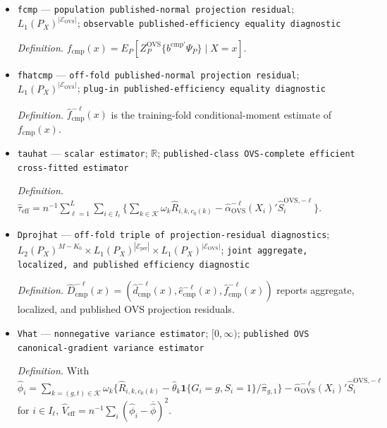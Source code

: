 \documentclass{article}
\begin{document}
\begin{itemize}
  \item \texttt{fcmp} --- \texttt{population published-\allowbreak{}normal projection residual}; \(L_1(P_X)^{|\mathcal E_{\mathrm{OVS}}|}\); \texttt{observable published-\allowbreak{}efficiency equality diagnostic}
  \par\smallskip\noindent\emph{Definition.} \(f_{\mathrm{cmp}}(x)=E_P[Z_P^{\mathrm{OVS}}\{b^{\mathrm{cmp}\prime}\Psi_P\}\mid X=x]\).
  \item \texttt{fhatcmp} --- \texttt{off-\allowbreak{}fold published-\allowbreak{}normal projection residual}; \(L_1(P_X)^{|\mathcal E_{\mathrm{OVS}}|}\); \texttt{plug-\allowbreak{}in published-\allowbreak{}efficiency equality diagnostic}
  \par\smallskip\noindent\emph{Definition.} \(\widehat f_{\mathrm{cmp}}^{-\ell}(x)\) is the training-fold conditional-moment estimate of \(f_{\mathrm{cmp}}(x)\).
  \item \texttt{tauhat} --- \texttt{scalar estimator}; \(\mathbb R\); \texttt{published-\allowbreak{}class OVS-\allowbreak{}complete efficient cross-\allowbreak{}fitted estimator}
  \par\smallskip\noindent\emph{Definition.} \(\widehat\tau_{\mathrm{eff}}=n^{-1}\sum_{\ell=1}^L\sum_{i\in I_\ell}\{\sum_{k\in\mathcal K}\omega_k\widehat R_{i,k,c_0(k)}-\widehat\alpha_{\mathrm{OVS}}^{-\ell}(X_i)'\widehat S_i^{\mathrm{OVS},-\ell}\}\).
  \item \texttt{Dprojhat} --- \texttt{off-\allowbreak{}fold triple of projection-\allowbreak{}residual diagnostics}; \(L_2(P_X)^{M-K_0}\times L_1(P_X)^{|\mathcal E_{\mathrm{per}}|}\times L_1(P_X)^{|\mathcal E_{\mathrm{OVS}}|}\); \texttt{joint aggregate,\allowbreak{} localized,\allowbreak{} and published efficiency diagnostic}
  \par\smallskip\noindent\emph{Definition.} \(\widehat D_{\mathrm{cmp}}^{-\ell}(x)=(\widehat d_{\mathrm{cmp}}^{-\ell}(x),\widehat e_{\mathrm{cmp}}^{-\ell}(x),\widehat f_{\mathrm{cmp}}^{-\ell}(x))\) reports aggregate, localized, and published OVS projection residuals.
  \item \texttt{Vhat} --- \texttt{nonnegative variance estimator}; \([0,\infty)\); \texttt{published OVS canonical-\allowbreak{}gradient variance estimator}
  \par\smallskip\noindent\emph{Definition.} With \(\widehat\phi_i=\sum_{k=(g,t)\in\mathcal K}\omega_k\{\widehat R_{i,k,c_0(k)}-\widehat\theta_k\mathbf 1\{G_i=g,S_i=1\}/\widehat\pi_{g,1}\}-\widehat\alpha_{\mathrm{OVS}}^{-\ell}(X_i)'\widehat S_i^{\mathrm{OVS},-\ell}\) for \(i\in I_\ell\), \(\widehat V_{\mathrm{eff}}=n^{-1}\sum_i(\widehat\phi_i-\overline{\widehat\phi})^2\).

\end{itemize}
\end{document}
